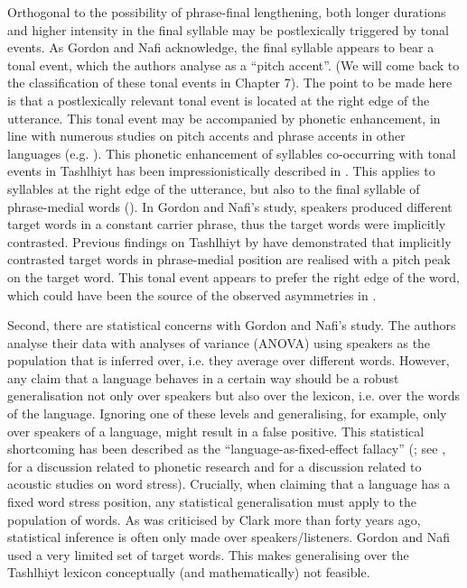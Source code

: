 Orthogonal to the possibility of phrase-final lengthening, both longer durations and higher intensity in the final syllable may be postlexically triggered by tonal events. As Gordon and Nafi acknowledge, the final syllable appears to bear a tonal event, which the authors analyse as a “pitch accent”. (We will come back to the classification of these tonal events in Chapter 7). The point to be made here is that a postlexically relevant tonal event is located at the right edge of the utterance. This tonal event may be accompanied by phonetic enhancement, in line with numerous studies on pitch accents and phrase accents in other languages (e.g. \citealt{Harrington.etal2000,Cole.etal2007,Katsika.etal2014}). This phonetic enhancement of syllables co-occurring with tonal events in Tashlhiyt has been impressionistically described in \citet{Grice.etal2015tash}. This applies to syllables at the right edge of the utterance, but also to the final syllable of phrase-medial words (\citealt{RoettgerGrice2015}). In Gordon and Nafi’s study, speakers produced different target words in a constant carrier phrase, thus the target words were implicitly contrasted. Previous findings on Tashlhiyt by \citet{Grice.etal2011} have demonstrated that implicitly contrasted target words in phrase-medial position are realised with a pitch peak on the target word. This tonal event appears to prefer the right edge of the word, which could have been the source of the observed asymmetries in \citet{GordonNafi2012}.

 
Second, there are statistical concerns with Gordon and Nafi’s study. The authors analyse their data with analyses of variance (ANOVA) using speakers as the population that is inferred over, i.e. they average over different words. However, any claim that a language behaves in a certain way should be a robust generalisation not only over speakers but also over the lexicon, i.e. over the words of the language. Ignoring one of these levels and generalising, for example, only over speakers of a language, might result in a false positive. This statistical shortcoming has been described as the “language-as-fixed-effect fallacy” (\citealt{Clark1973}; see \citealt{Winter2011}, for a discussion related to phonetic research and \citealt{RoettgerGordon.underreview} for a discussion related to acoustic studies on word stress). Crucially, when claiming that a language has a fixed word stress position, any statistical generalisation must apply to the population of words. As was criticised by Clark more than forty years ago, statistical inference is often only made over speakers/listeners. Gordon and Nafi used a very limited set of target words. This makes generalising over the Tashlhiyt lexicon conceptually (and mathematically) not feasible.


